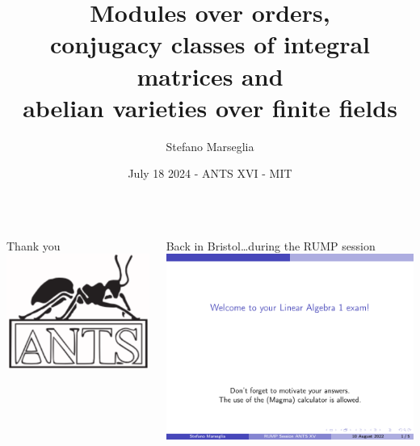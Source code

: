 \documentclass[aspectratio=169,handout,usenames,dvipsnames]{beamer}
\title[ANTS XVI - MIT]{Modules over orders,\\conjugacy classes of integral matrices and\\ abelian varieties over finite fields}
\subtitle{}
\author[Stefano Marseglia]{Stefano Marseglia}
\institute[UPF]{University of French Polynesia}
\date[July 18 2024]{July 18 2024 - ANTS XVI - MIT}
\begin{document}
\begin{frame}{}
   \maketitle
\end{frame}

\begin{frame}{}
   \begin{columns}
      \begin{column}{0.5\textwidth}
         {\Huge Thank you} \includegraphics[scale=0.5]{ants.PNG}
      \end{column}
      \pause
      \begin{column}{0.5\textwidth}  %
          \begin{center}
            Back in Bristol\dots during the RUMP session\vspace*{2em}
            \includegraphics[scale=0.5]{back_in_Bristol.pdf}

\end{center}
\end{column}
\end{columns}
\end{frame}
\end{document}
